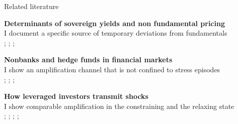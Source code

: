 \documentclass[aspectratio=169,10pt]{beamer}
\newcommand{\lvs}{\vspace{0.32cm}}
\newenvironment{wideitemize}{\itemize\addtolength{\itemsep}{0.45pc}}{\enditemize}
\begin{document}
\begin{frame}{Related literature}
\hypertarget{relatedlit}{}
\lvs
\begin{wideitemize}
  \item \textbf{Determinants of sovereign yields and non fundamental pricing}\\
        I document a specific source of temporary deviations from fundamentals\\
        {\scriptsize\color{softgrey} \citet{degauwe2013}; \citet{greenwood2014}; \citet{koijen2021}; \citet{duffie2010}}
  \item \textbf{Nonbanks and hedge funds in financial markets}\\
        I show an amplification channel that is not confined to stress episodes\\
        {\scriptsize\color{softgrey} \citet{barth2025}; \citet{kruttli2025}; \citet{anaya2025}; \citet{pelizzon2025}}
  \item \textbf{How leveraged investors transmit shocks}\\
        I show comparable amplification in the constraining and the relaxing state\\
        {\scriptsize\color{softgrey} \citet{adrian2014}; \citet{brunnermeier2009}; \citet{avalos2023}; \citet{deLong1990}; \citet{moskowitz2012}}
\end{wideitemize}
\end{frame}
\end{document}
